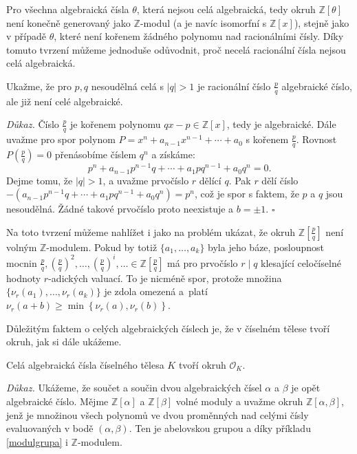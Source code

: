 \documentclass[12pt]{report}
\begin{document}
Pro všechna algebraická čísla $\theta$, která nejsou celá algebraická, tedy okruh $\mathbb{Z}[\theta]$ není konečně generovaný jako $\mathbb{Z}$-modul (a je navíc isomorfní s $\mathbb{Z}[x]$), stejně jako v případě $\theta$, které není kořenem žádného polynomu nad racionálními čísly.  Díky tomuto tvrzení můžeme jednoduše odůvodnit, proč necelá racionální čísla nejsou celá algebraická.
\begin{priklad}\label{racalg}
Ukažme, že pro $p,q$ nesoudělná celá s $\vert q\vert > 1$ je racionální číslo $\frac{p}{q}$ algebraické číslo, ale již není celé algebraické.
\end{priklad}
\noindent \textit{Důkaz.} Číslo $\frac{p}{q}$ je kořenem polynomu $qx-p \in \mathbb{Z}[x]$, tedy je algebraické. Dále uvažme pro spor polynom $P = x^n + a_{n-1} x^{n-1} + \cdots  + a_0$ s kořenem $\frac{p}{q}$. Rovnost $P\left(\frac{p}{q} \right)=0$ přenásobíme číslem $q^n$ a získáme:
\begin{equation*}
p^n + a_{n-1} p^{n-1} q + \cdots + a_1 p q^{n-1} + a_0 q^n = 0.
\end{equation*}
Dejme tomu, že $\vert q \vert > 1$, a uvažme prvočíslo $r$ dělící $q$. Pak $r$ dělí číslo $-(a_{n-1} p^{n-1} q + \cdots + a_1 p q^{n-1} + a_0 q^n) = p^n$, což je spor s faktem, že $p$ a $q$ jsou nesoudělná. Žádné takové prvočíslo proto neexistuje a $b = \pm 1$. \hfill $\square$ 

\begin{poznamka}
Na toto tvrzení můžeme nahlížet i jako na problém ukázat, že okruh $\mathbb{Z}\left[\frac{p}{q}\right]$ není volným $\mathbb{Z}$-modulem. Pokud by totiž $\lbrace a_1,\dots,a_k \rbrace$ byla jeho báze, posloupnost mocnin $\frac{p}{q}, \left(\frac{p}{q}\right)^2, \dots, \left(\frac{p}{q}\right)^i, \dots \in \mathbb{Z}\left[\frac{p}{q}\right]$ má pro prvočíslo $r \mid q$ klesající celočíselné hodnoty $r$-adických valuací. To je nicméně spor, protože množina $\lbrace \nu_r(a_1),\dots,\nu_r(a_k) \rbrace$ je zdola omezená a~platí $\nu_r(a+b) \geqslant \min\left\lbrace\nu_r(a),\nu_r(b)\right\rbrace$.
\end{poznamka}

Důležitým faktem o celých algebraických číslech je, že v číselném tělese tvoří okruh, jak si dále ukážeme.

\begin{veta}
Celá algebraická čísla číselného tělesa $K$ tvoří okruh $\mathcal{O}_K$.
\end{veta}
\noindent \textit{Důkaz.} Ukážeme, že součet a součin dvou algebraických čísel $\alpha$ a $\beta$ je opět algebraické číslo. Mějme $\mathbb{Z}[\alpha]$ a $\mathbb{Z}[\beta]$ volné moduly a uvažme okruh $\mathbb{Z}[\alpha,\beta]$, jenž je množinou všech polynomů ve dvou proměnných nad celými čísly evaluovaných v bodě $(\alpha,\beta)$. Ten je abelovskou grupou a díky příkladu \ref{modulgrupa} i $\mathbb{Z}$-modulem.
\end{document}
